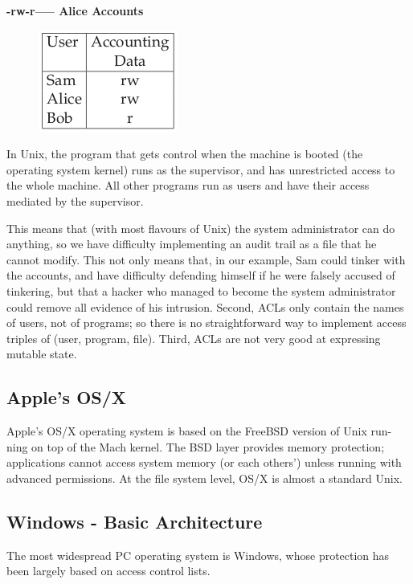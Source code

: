 				{\bf \color{blue} -rw-r----- Alice Accounts} \\
				\begin{figure}[H]
					\includegraphics[scale=0.6]{pics/accessControlLists}
				\end{figure}

			In Unix, the program that gets control when the machine is booted (the
			operating system kernel) runs as the supervisor, and has unrestricted access
			to the whole machine. All other programs run as users and have their access
			mediated by the supervisor. 

			This means that (with most flavours of Unix) the system administrator can
			do anything, so we have difficulty implementing an audit trail as a file that
			he cannot modify. This not only means that, in our example, Sam could tinker
			with the accounts, and have difficulty defending himself if he were falsely
			accused of tinkering, but that a hacker who managed to become the system
			administrator could remove all evidence of his intrusion.
			Second, ACLs only contain the names of users, not of programs; so there
			is no straightforward way to implement access triples of (user, program, file).
			Third, ACLs are not very good at expressing mutable state.

		\subsection{Apple's OS/X}

			Apple’s OS/X operating system is based on the FreeBSD version of Unix run-
			ning on top of the Mach kernel. The BSD layer provides memory protection;
			applications cannot access system memory (or each others’) unless running
			with advanced permissions. At the file system level, OS/X is almost a standard Unix.


		\subsection{Windows - Basic Architecture}

			The most widespread PC operating system is Windows, whose protection
			has been largely based on access control lists. 
			
